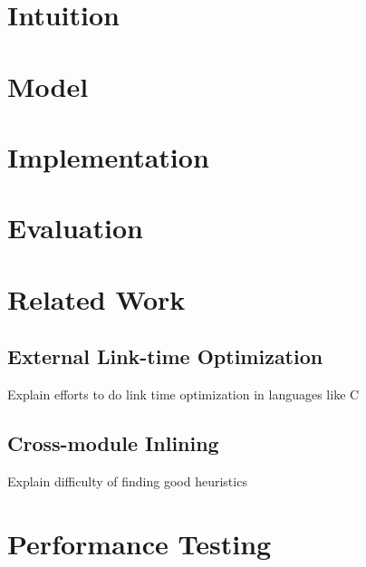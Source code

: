 \documentclass{llncs}
\begin{document}
\section{Intuition}

\section{Model}

\section{Implementation}

\section{Evaluation}

\section{Related Work}
   \subsection{External Link-time Optimization}

   Explain efforts to do link time optimization in languages like C 
   
   \subsection{Cross-module Inlining}

   Explain difficulty of finding good heuristics

\section{Performance Testing}
  
\end{document}
